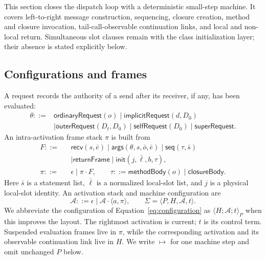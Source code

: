 \documentclass[11pt]{article}
\numberwithin{equation}{section}
\newcommand{\kw}[1]{\ensuremath{\mathsf{#1}}}
\begin{document}
This section closes the dispatch loop with a deterministic small-step machine.
It covers left-to-right message construction, sequencing, closure creation,
method and closure invocation, tail-call-observable continuation links, and
local and non-local return.  Simultaneous slot clauses remain with the class
initialization layer; their absence is stated explicitly below.

\subsection{Configurations and frames}

A request records the authority of a send after its receiver, if any, has been
evaluated:
\begin{equation}\label{eq:request-grammar}
 \begin{aligned}
 \theta ::={}&\kw{ordinaryRequest}(o)\mid\kw{implicitRequest}(d,D_0)\\
 &\mid\kw{outerRequest}(D_t,D_0)\mid\kw{selfRequest}(D_0)
 \mid\kw{superRequest}.
 \end{aligned}
\end{equation}
An intra-activation frame stack $\pi$ is built from
\begin{equation}\label{eq:frame-grammar}
\begin{array}{rcl}
 F ::=&& \kw{recv}(s,\bar e)
 \mid \kw{args}(\theta,s,\bar o,\bar e)
 \mid \kw{seq}(\tau,\bar s)\\
 &&\mid \kw{returnFrame}
 \mid \kw{init}(j,\bar\ell,b,\tau),\\
 \pi ::=&& \epsilon\mid\pi\mathbin{\cdot}F,
 \qquad
 \tau ::= \kw{methodBody}(o)\mid\kw{closureBody}.
\end{array}
\end{equation}
Here $\bar s$ is a statement list, $\bar\ell$ is a normalized local-slot list,
and $j$ is a physical local-slot identity.  An activation stack and machine
configuration are
\begin{equation}\label{eq:configuration}
 \mathcal A::=\epsilon\mid\mathcal A\mathbin{\cdot}\langle a,\pi\rangle,
 \qquad
 \Sigma=\langle P,H,\mathcal A,t\rangle.
\end{equation}
We abbreviate the configuration of Equation~\eqref{eq:configuration} as
$\langle H;\mathcal A;t\rangle_P$ when this improves the layout.
The rightmost activation is current; $t$ is its control term.  Suspended
evaluation frames live in $\pi$, while the corresponding activation and its
observable continuation link live in $H$.  We write $\longmapsto$ for one
machine step and omit unchanged $P$ below.
\end{document}
